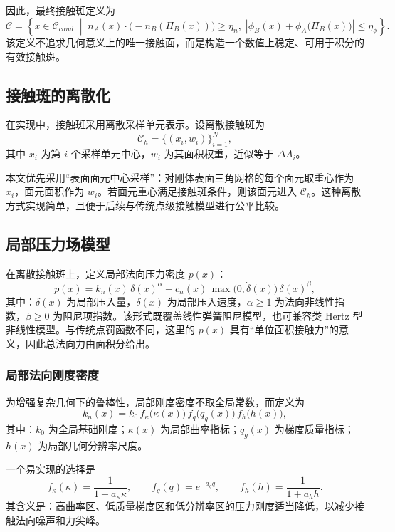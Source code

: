 因此，最终接触斑定义为
\begin{equation}
\mathcal{C}=\left\{x\in \mathcal{C}_{cand}\;\middle|\;
 n_A(x)\cdot\bigl(-n_B(\Pi_B(x))\bigr)\ge \eta_n,
 \;\left|\phi_B(x)+\phi_A\bigl(\Pi_B(x)\bigr)\right|\le \eta_\phi
\right\}.
\end{equation}
该定义不追求几何意义上的唯一接触面，而是构造一个数值上稳定、可用于积分的有效接触斑。

\subsection{接触斑的离散化}
在实现中，接触斑采用离散采样单元表示。设离散接触斑为
\begin{equation}
\mathcal{C}_h=\{(x_i,w_i)\}_{i=1}^{N},
\end{equation}
其中 $x_i$ 为第 $i$ 个采样单元中心，$w_i$ 为其面积权重，近似等于 $\Delta A_i$。

本文优先采用“表面面元中心采样”：对刚体表面三角网格的每个面元取重心作为 $x_i$，面元面积作为 $w_i$。若面元重心满足接触斑条件，则该面元进入 $\mathcal{C}_h$。这种离散方式实现简单，且便于后续与传统点级接触模型进行公平比较。

\subsection{局部压力场模型}
在离散接触斑上，定义局部法向压力密度 $p(x)$：
\begin{equation}
p(x)=k_n(x)\,\delta(x)^{\alpha}+c_n(x)\,\max\bigl(0,\dot{\delta}(x)\bigr)\,\delta(x)^{\beta},
\end{equation}
其中：$\delta(x)$ 为局部压入量，$\dot{\delta}(x)$ 为局部压入速度，$\alpha\ge 1$ 为法向非线性指数，$\beta\ge 0$ 为阻尼项指数。该形式既覆盖线性弹簧阻尼模型，也可兼容类 Hertz 型非线性模型。与传统点罚函数不同，这里的 $p(x)$ 具有“单位面积接触力”的意义，因此总法向力由面积分给出。

\subsubsection{局部法向刚度密度}
为增强复杂几何下的鲁棒性，局部刚度密度不取全局常数，而定义为
\begin{equation}
k_n(x)=k_0\,f_\kappa\bigl(\kappa(x)\bigr)\,f_q\bigl(q_g(x)\bigr)\,f_h\bigl(h(x)\bigr),
\end{equation}
其中：$k_0$ 为全局基础刚度；$\kappa(x)$ 为局部曲率指标；$q_g(x)$ 为梯度质量指标；$h(x)$ 为局部几何分辨率尺度。

一个易实现的选择是
\begin{equation}
f_\kappa(\kappa)=\frac{1}{1+a_\kappa \kappa},\qquad
f_q(q)=e^{-a_q q},\qquad
f_h(h)=\frac{1}{1+a_h h}.
\end{equation}
其含义是：高曲率区、低质量梯度区和低分辨率区的压力刚度适当降低，以减少接触法向噪声和力尖峰。


